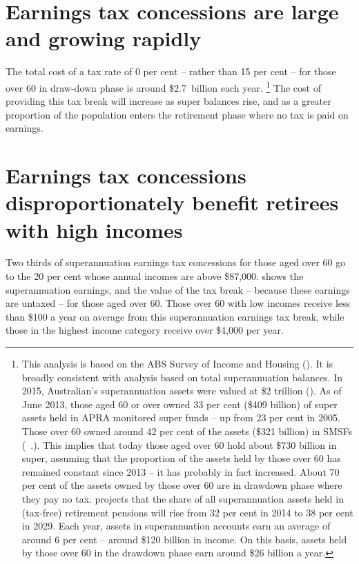 %
\oneraggedpage
\section{Earnings tax concessions are large and growing rapidly}\label{sec:SUPER-6-1}
The total cost of a tax rate of 0 per cent – rather than 15 per cent – for those over 60 in draw-down phase is around \$2.7~billion each year.%
\footnote{This analysis is based on the ABS Survey of Income and Housing (\textcite{ABS2015-Survey-of-income-and-housing-2013-14}). It is broadly consistent with analysis based on total superannuation balances. In 2015, Australian’s superannuation assets were valued at \$2 trillion (\textcites[][6]{APRA2015JuneSuperPerformance}[][7]{MinifieSavageCameron2015}). As of June 2013, those aged 60 or over owned 33 per cent (\$409 billion) of super assets held in APRA monitored super funds – up from 23 per cent in 2005. Those over 60 owned around 42 per cent of the assets (\$321 billion) in SMSFs (\gao\ \textcite{ATO2014e}.). This implies that today those aged over 60 hold about \$730 billion in super, assuming that the proportion of the assets held by those over 60 has remained constant since 2013 – it has probably in fact increased. About 70 per cent of the assets owned by those over 60 are in drawdown phase where they pay no tax. \textcite[][23]{RiceWarner2015SubmissionTaxWhitePaper} projects that the share of all superannuation assets held in (tax-free) retirement pensions will rise from 32 per cent in 2014 to 38 per cent in 2029. Each year, assets in superannuation accounts earn an average of around 6 per cent – around \$120 billion in income. On this basis, assets held by those over 60 in the drawdown phase earn around \$26 billion a year.}  The cost of providing this tax break will increase as super balances rise, and as a greater proportion of the population enters the retirement phase where no tax is paid on earnings. 

\section{Earnings tax concessions disproportionately benefit retirees with high incomes}\label{sec:SUPER-6-2}
Two thirds of superannuation earnings tax concessions for those aged over 60 go to the 20 per cent whose annual incomes are above \$87,000.  shows the superannuation earnings, and the value of the tax break – because these earnings are untaxed – for those aged over 60. Those over 60 with low incomes receive less than \$100 a year on average from this superannuation earnings tax break, while those in the highest income category receive over \$4,000 per year.

